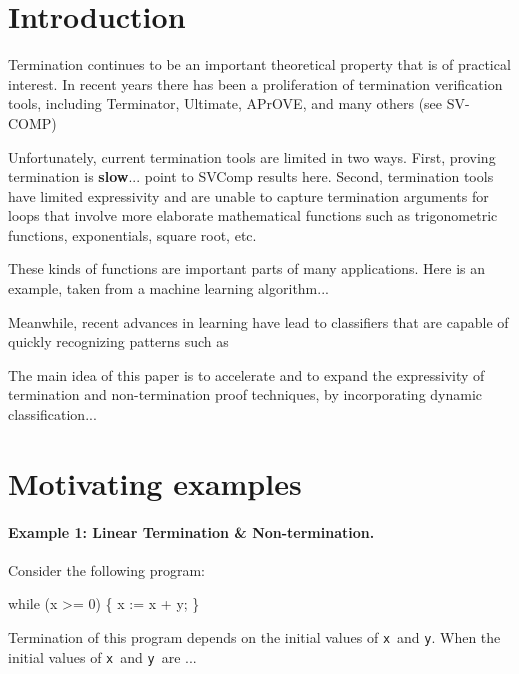 
\section{Introduction}

Termination continues to be an important theoretical property that is
of practical interest. 
In recent years there has been a proliferation of termination
verification tools, including
{\sc Terminator},
Ultimate,
APrOVE,
and many others
(see SV-COMP)

Unfortunately, current termination tools are limited in two ways.
First, proving termination is {\bf slow}...
point to SVComp results here.
Second, termination tools have limited expressivity 
and are unable to capture termination arguments for 
loops that involve more elaborate mathematical functions
such as trigonometric functions, exponentials, square root, etc.

These kinds of functions are important parts of many applications.
Here is an example, taken from a machine learning algorithm...


Meanwhile, recent advances in learning have lead to classifiers
that are capable of quickly recognizing patterns such as


The main idea of this paper is to accelerate and to expand the expressivity of termination and non-termination proof  techniques, by
incorporating dynamic classification...



\section{Motivating examples}
\newcommand\tx{\texttt{x}}
\newcommand\ty{\texttt{y}}
\newcommand\boxedtt[1]{\fbox{\begin{minipage}{2.5in} #1 \end{minipage}}}
\newcommand\vtrace[1]{{\tt\bf vtrace$_{#1}$}}
\paragraph{Example 1: Linear Termination \& Non-termination.}
Consider the following program:
\begin{center}
  \begin{program}[style=tt]
    wh\tab ile (x >= 0) \{
      x := x + y; \untab
    \}
  \end{program}
\end{center}
Termination of this program depends on the initial values of \tx\ and \ty.
When the initial values of \tx\ and \ty\ are ...

